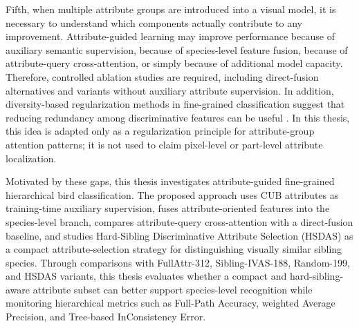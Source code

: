 Fifth, when multiple attribute groups are introduced into a visual model, it is necessary to understand which components actually contribute to any improvement. Attribute-guided learning may improve performance because of auxiliary semantic supervision, because of species-level feature fusion, because of attribute-query cross-attention, or simply because of additional model capacity. Therefore, controlled ablation studies are required, including direct-fusion alternatives and variants without auxiliary attribute supervision. In addition, diversity-based regularization methods in fine-grained classification suggest that reducing redundancy among discriminative features can be useful \cite{Chang_2020}. In this thesis, this idea is adapted only as a regularization principle for attribute-group attention patterns; it is not used to claim pixel-level or part-level attribute localization.

Motivated by these gaps, this thesis investigates attribute-guided fine-grained hierarchical bird classification. The proposed approach uses CUB attributes as training-time auxiliary supervision, fuses attribute-oriented features into the species-level branch, compares attribute-query cross-attention with a direct-fusion baseline, and studies Hard-Sibling Discriminative Attribute Selection (HSDAS) as a compact attribute-selection strategy for distinguishing visually similar sibling species. Through comparisons with FullAttr-312, Sibling-IVAS-188, Random-199, and HSDAS variants, this thesis evaluates whether a compact and hard-sibling-aware attribute subset can better support species-level recognition while monitoring hierarchical metrics such as Full-Path Accuracy, weighted Average Precision, and Tree-based InConsistency Error.
